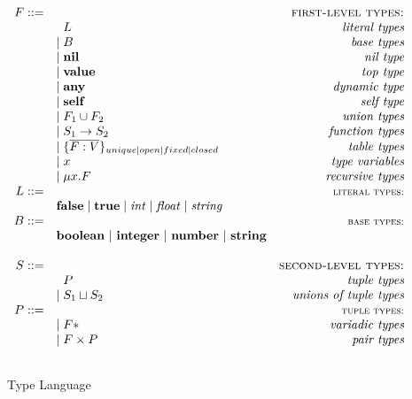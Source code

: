 \documentclass[10pt]{sigplanconf}
\newcommand{\Value}{\mathbf{value}}
\newcommand{\Any}{\mathbf{any}}
\newcommand{\Nil}{\mathbf{nil}}
\newcommand{\Self}{\mathbf{self}}
\newcommand{\False}{\mathbf{false}}
\newcommand{\True}{\mathbf{true}}
\newcommand{\Boolean}{\mathbf{boolean}}
\newcommand{\Integer}{\mathbf{integer}}
\newcommand{\Number}{\mathbf{number}}
\newcommand{\String}{\mathbf{string}}
\newcommand{\Void}{\Nil{*}}
\begin{document}
\begin{figure}[t]
{\scriptsize
$$
\begin{array}{rlr}
F ::= & & \textsc{first-level types:}\\
& \;\; L & \textit{literal types}\\
& | \; B & \textit{base types}\\
& | \; \Nil & \textit{nil type}\\
& | \; \Value & \textit{top type}\\
& | \; \Any & \textit{dynamic type}\\
& | \; \Self & \textit{self type}\\
& | \; F_{1} \cup F_{2} & \textit{union types}\\
& | \; S_{1} \rightarrow S_{2} & \textit{function types}\\
& | \; \{\overline{F:V}\}_{unique|open|fixed|closed} & \textit{table types}\\
& |\; x & \textit{type variables}\\
& | \; \mu x.F & \textit{recursive types}\\
L ::= & & \textsc{{\small literal types:}}\\
&  \False \; | \; \True \; | \; {\it int} \; | \; {\it float} \; | \; {\it string} &\\
B ::= & & \textsc{{\small base types:}}\\
& \Boolean \ |\  \Integer \ |\ \Number\ |\ \String &\\\\
S ::= & & \textsc{second-level types:}\\
& \;\; P & \textit{tuple types}\\
& | \; S_{1} \sqcup S_{2} & \textit{unions of tuple types}\\
P ::= & & \textsc{{\small tuple types:}}\\
& | \; F{*} & \textit{variadic types}\\
& | \; F \times P & \textit{pair types}\\\\
\end{array}
$$
}
\caption{Type Language}
\label{fig:typelang}
\end{figure}
\end{document}
